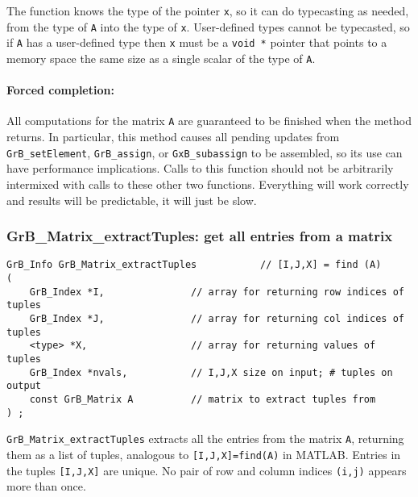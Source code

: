 \documentclass[12pt]{article}
\begin{document}
The function knows the type of the pointer \verb'x', so it can do typecasting
as needed, from the type of \verb'A' into the type of \verb'x'.  User-defined
types cannot be typecasted, so if \verb'A' has a user-defined type then
\verb'x' must be a \verb'void *' pointer that points to a memory space the same
size as a single scalar of the type of \verb'A'.

\paragraph{Forced completion:}
All computations for the matrix \verb'A' are
guaranteed to be finished when the method returns.
%
In particular, this method causes all pending updates from
\verb'GrB_setElement', \verb'GrB_assign', or \verb'GxB_subassign' to be
assembled, so its use can have performance implications.  Calls to this
function should not be arbitrarily intermixed with calls to these other two
functions.  Everything will work correctly and results will be predictable, it
will just be slow.

\subsubsection{{\sf GrB\_Matrix\_extractTuples:} get all entries from a matrix}
\label{matrix_extractTuples}

\begin{mdframed}[userdefinedwidth=6in]
{\footnotesize
\begin{verbatim}
GrB_Info GrB_Matrix_extractTuples           // [I,J,X] = find (A)
(
    GrB_Index *I,               // array for returning row indices of tuples
    GrB_Index *J,               // array for returning col indices of tuples
    <type> *X,                  // array for returning values of tuples
    GrB_Index *nvals,           // I,J,X size on input; # tuples on output
    const GrB_Matrix A          // matrix to extract tuples from
) ;
\end{verbatim} } \end{mdframed}

\verb'GrB_Matrix_extractTuples' extracts all the entries from the matrix
\verb'A', returning them as a list of tuples, analogous to
\verb'[I,J,X]=find(A)' in MATLAB.  Entries in the tuples \verb'[I,J,X]' are
unique.  No pair of row and column indices \verb'(i,j)' appears more than once.
\end{document}

